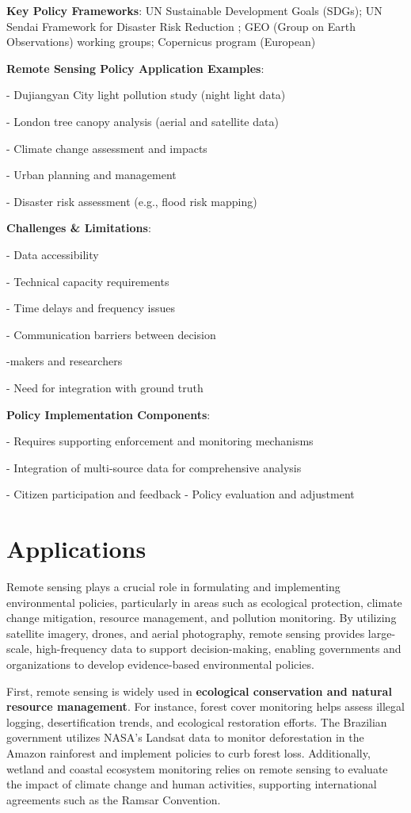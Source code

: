 \documentclass[
  letterpaper,
]{scrbook}
\begin{document}
\textbf{Key Policy Frameworks}: UN Sustainable Development Goals (SDGs);
UN Sendai Framework for Disaster Risk Reduction ; GEO (Group on Earth
Observations) working groups; Copernicus program (European)

\textbf{Remote Sensing Policy Application Examples}:

- Dujiangyan City light pollution study (night light data)

- London tree canopy analysis (aerial and satellite data)

- Climate change assessment and impacts

- Urban planning and management

- Disaster risk assessment (e.g., flood risk mapping)

\textbf{Challenges \& Limitations}:

- Data accessibility

- Technical capacity requirements

- Time delays and frequency issues

- Communication barriers between decision

-makers and researchers

- Need for integration with ground truth

\textbf{Policy Implementation Components}:

- Requires supporting enforcement and monitoring mechanisms

- Integration of multi-source data for comprehensive analysis

- Citizen participation and feedback - Policy evaluation and adjustment

\section{Applications}\label{applications-2}

Remote sensing plays a crucial role in formulating and implementing
environmental policies, particularly in areas such as ecological
protection, climate change mitigation, resource management, and
pollution monitoring. By utilizing satellite imagery, drones, and aerial
photography, remote sensing provides large-scale, high-frequency data to
support decision-making, enabling governments and organizations to
develop evidence-based environmental policies.

First, remote sensing is widely used in \textbf{ecological conservation
and natural resource management}. For instance, forest cover monitoring
helps assess illegal logging, desertification trends, and ecological
restoration efforts. The Brazilian government utilizes NASA's Landsat
data to monitor deforestation in the Amazon rainforest and implement
policies to curb forest loss. Additionally, wetland and coastal
ecosystem monitoring relies on remote sensing to evaluate the impact of
climate change and human activities, supporting international agreements
such as the Ramsar Convention.
\end{document}
